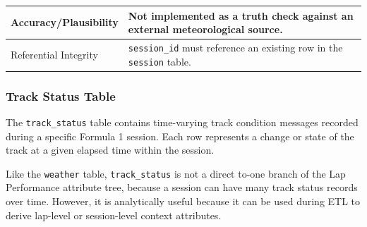 \documentclass[a4paper,11pt]{article}
\begin{document}
\begin{longtable}{p{3.5cm}p{11cm}}
		Accuracy/Plausibility
		& Not implemented as a truth check against an external meteorological source. \\
		\midrule
		
		Referential Integrity
		& \texttt{session\_id} must reference an existing row in the \texttt{session}
		table.  \\
		\bottomrule
	\end{longtable}
	
	\subsubsection{Track Status Table}
	
	The \texttt{track\_status} table contains time-varying track condition messages
	recorded during a specific Formula 1 session. Each row represents a change or
	state of the track at a given elapsed time within the session.
	
	Like the \texttt{weather} table, \texttt{track\_status} is not a direct to-one
	branch of the Lap Performance attribute tree, because a session can have many
	track status records over time. However, it is analytically useful because it can
	be used during ETL to derive lap-level or session-level context attributes.
	
\end{document}
